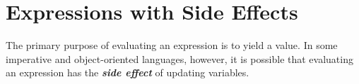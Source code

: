 \section{Expressions with Side Effects}
\label{sec:exp-side-effect}

The primary purpose of evaluating an expression is to yield a value. In some imperative and object-oriented languages, however, it is possible that evaluating an expression has the \textit{\textbf{side effect}} of updating variables.
